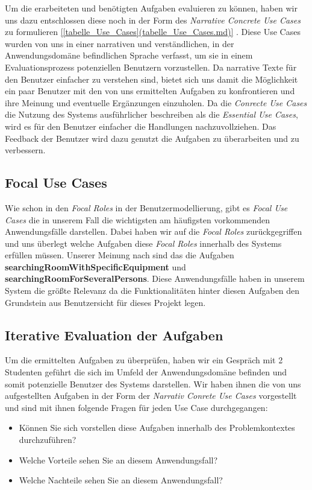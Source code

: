 Um die erarbeiteten und benötigten Aufgaben evaluieren zu können, haben wir
uns dazu entschlossen diese noch in der Form des \textit{Narrative Concrete Use Cases}
zu formulieren \ref{[tabelle_Use_Cases](tabelle_Use_Cases.md)} \citep{[Quelle](für narrativ concrete use cases)}.
Diese Use Cases wurden von uns in einer narrativen und verständlichen, in der
Anwendungsdomäne befindlichen Sprache verfasst, um sie in einem
Evaluationsprozess potenziellen Benutzern vorzustellen.
Da narrative Texte für den Benutzer einfacher zu verstehen sind, bietet sich uns
damit die Möglichkeit ein paar Benutzer mit den von uns ermittelten Aufgaben zu
konfrontieren und ihre Meinung und eventuelle Ergänzungen einzuholen.
Da die \textit{Conrecte Use Cases} die Nutzung des Systems ausführlicher beschreiben
als die \textit{Essential Use Cases}, wird es für den Benutzer einfacher die
Handlungen nachzuvollziehen.
Das Feedback der Benutzer wird dazu genutzt die Aufgaben zu überarbeiten und
zu verbessern. 


\subsection{Focal Use Cases}
\label{sec:Focal Use Cases}
Wie schon in den \textit{Focal Roles} in der Benutzermodellierung, gibt es
\textit{Focal Use Cases} die in unserem Fall die wichtigsten \bzw am häufigsten
vorkommenden Anwendungsfälle darstellen. Dabei haben wir auf die \textit{Focal Roles}
zurückgegriffen und uns überlegt welche Aufgaben diese \textit{Focal Roles}
innerhalb des Systems erfüllen müssen.
Unserer Meinung nach sind das die Aufgaben \textbf{searchingRoomWithSpecificEquipment}
und \textbf{searchingRoomForSeveralPersons}. Diese Anwendungsfälle haben in unserem
System die größte Relevanz da die Funktionalitäten hinter diesen Aufgaben den
Grundstein aus Benutzersicht für dieses Projekt legen. 


\subsection{Iterative Evaluation der Aufgaben}
Um die ermittelten Aufgaben zu überprüfen, haben wir ein Gespräch mit
2 Studenten geführt die sich im Umfeld der Anwendungsdomäne befinden und somit
potenzielle Benutzer des Systems darstellen. Wir haben ihnen die von uns
aufgestellten Aufgaben in der Form der \textit{Narrativ Conrete Use Cases} vorgestellt
und sind mit ihnen folgende Fragen für jeden Use Case durchgegangen:

\begin{itemize}
	\item Können Sie sich vorstellen diese Aufgaben innerhalb des Problemkontextes durchzuführen?
	\item Welche Vorteile sehen Sie an diesem Anwendungsfall?
	\item Welche Nachteile sehen Sie an diesem Anwendungsfall?
\end{itemize}


